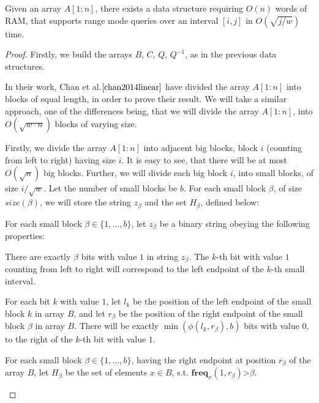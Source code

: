 \documentclass[runningheads]{llncs}
\begin{document}
\begin{lemma}
    Given an array $A[1:n]$, there exists a data structure requiring $O(n)$ words of RAM, that supports 
    range mode queries over an interval $[i,j]$ in $O( \sqrt{j/w}  )$ time.    
\end{lemma}
\begin{proof}
    Firstly, we build the arrays $B$, $C$, $Q$, $Q^{-1}$, as in the previous data structures.
    
    In their work, Chan et al.$\cite{chan2014linear}$ have divided the array $A[1:n]$ into blocks of equal length, in order to prove their result.
    We will take a similar approach, one of the differences being, that we will divide the array $A[1:n]$, into $O(\sqrt{w\cdot n})$ blocks of varying size.

    Firstly, we divide the array $A[1:n]$ into adjacent big blocks, block $i$ (counting from left to right) having size $i$. It is easy to see, that there will be at most $O(\sqrt{n})$ big blocks.
    Further, we will divide each big block $i$, into small blocks, of size $i/\sqrt{w}$.
    Let the number of small blocks be $b$. For each small block $\beta$, of size $size(\beta)$, we will store the string $z_{\beta}$ and the set $H_{\beta}$, defined below:
    \begin{definition}
        For each small block $\beta\in\{1,\dots , b\}$, let $z_\beta$ be a binary string obeying the following properties:
        \begin{property}
            There are exactly $\beta$ bits with value $1$ in string $z_{\beta}$. The $k$-th bit with value $1$ counting from left to right will correspond to the left endpoint of the $k$-th small interval.    
        \end{property}

        \begin{property}
            For each bit $k$ with value $1$, let $l_k$ be the position of the left endpoint of the small block $k$ in array $B$, and let $r_{\beta}$ 
            be the position of the right endpoint of the small block $\beta$ in array $B$. 
            There will be exactly $\min(\phi(l_k,r_{\beta}) , b )$ bits with value $0$, to the right of the $k$-th bit with value $1$.
        \end{property}

    \end{definition}

    \begin{definition}
        For each small block $\beta \in \{1, \dots, b\}$, having the right endpoint at position $r_{\beta}$ of the array $B$, let $H_\beta$ be the set of elements $x\in B$, s.t. $\textbf{freq}_x(1,r_{\beta})$>$\beta$.
    \end{definition}


\end{proof}
\end{document}
